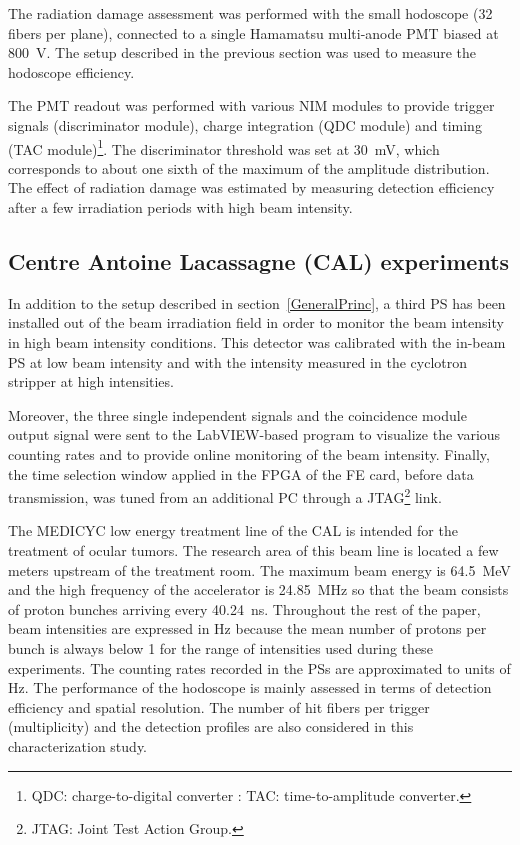 \documentclass[a4paper,11pt]{article}
\begin{document}
The radiation damage assessment was performed with the small hodoscope (32 fibers per plane), connected to a single Hamamatsu multi-anode PMT biased at 800~V. The setup described in the previous section was used to measure the hodoscope efficiency.  

The PMT readout was performed with various NIM modules to provide trigger signals (discriminator module), charge integration (QDC module) and timing (TAC module)\footnote{QDC: charge-to-digital converter : TAC: time-to-amplitude converter.}. The discriminator threshold was set at 30~mV, which corresponds to about one sixth of the maximum of the amplitude distribution. The effect of radiation damage was estimated by measuring detection efficiency after a few irradiation periods with high beam intensity.

\subsection{Centre Antoine Lacassagne (CAL) experiments}
\label{In-beam_tests}

In addition to the setup described in section~\ref{GeneralPrinc}, a third PS has been installed out of the beam irradiation field in order to monitor the beam intensity in high beam intensity conditions. This detector was calibrated with the in-beam PS at low beam intensity and with the intensity measured in the cyclotron stripper at high intensities. 

Moreover, the three single independent signals and the coincidence module output signal were sent to the LabVIEW-based program to visualize the various counting rates and to provide online monitoring of the beam intensity. 
Finally, the time selection window applied in the FPGA of the FE card, before data transmission, was tuned from an additional PC through a JTAG\footnote{JTAG: Joint Test Action Group.} link.

The MEDICYC low energy treatment line of the CAL is intended for the treatment of ocular tumors. The research area of this beam line is located a few meters upstream of the treatment room. The maximum beam energy is 64.5~MeV and the high frequency of the accelerator is 24.85~MHz so that the beam consists of proton bunches arriving every 40.24~ns. Throughout the rest of the paper, beam intensities are expressed in Hz because the mean number of protons per bunch is always below 1 for the range of intensities used during these experiments. The counting rates recorded in the PSs are approximated to units of Hz.
The performance of the hodoscope is mainly assessed in terms of detection efficiency and spatial resolution. The number of hit fibers per trigger (multiplicity) and the detection profiles are also considered in this characterization study.
\end{document}
